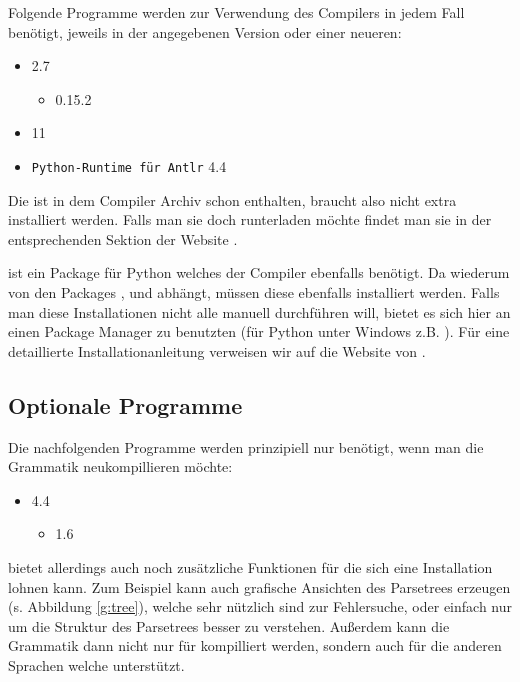 Folgende Programme werden zur Verwendung des Compilers in jedem Fall benötigt, jeweils in der angegebenen Version oder einer neueren:

\begin{itemize}
\item {} 2.7
\begin{itemize}
\item {} 0.15.2
\end{itemize}

\item {} 11
\item \texttt{Python-Runtime für Antlr} 4.4
\end{itemize}

Die  ist in dem Compiler Archiv schon enthalten, braucht also nicht extra installiert werden. Falls man sie doch runterladen möchte findet man sie in der entsprechenden Sektion der  Website \cite{pyruntime}.

 ist ein Package für Python welches der Compiler ebenfalls benötigt. Da  wiederum von den Packages ,  und  abhängt, müssen diese ebenfalls installiert werden. Falls man diese Installationen nicht alle manuell durchführen will, bietet es sich hier an einen Package Manager zu benutzten (für Python unter Windows z.B. ). Für eine detaillierte Installationanleitung verweisen wir auf die Website von   \cite{pandas}.

\subsection{Optionale Programme}

Die nachfolgenden Programme werden prinzipiell nur benötigt, wenn man die Grammatik  neukompillieren möchte:
\begin{itemize}
\item {} 4.4

\begin{itemize}
\item {} 1.6
\end{itemize}
\end{itemize}

 bietet allerdings auch noch zusätzliche Funktionen für die sich eine Installation lohnen kann. Zum Beispiel kann  auch grafische Ansichten des Parsetrees erzeugen (s. Abbildung \ref{g:tree}), welche sehr nützlich sind zur Fehlersuche, oder einfach nur um die Struktur des Parsetrees besser zu verstehen. Außerdem kann die Grammatik dann nicht nur für  kompilliert werden, sondern auch für die anderen Sprachen welche   unterstützt.


